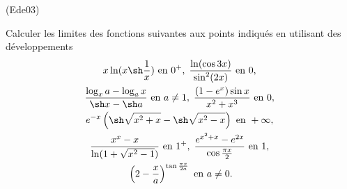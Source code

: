 \begin{tiny}(Ede03)\end{tiny}
Calculer les limites des fonctions suivantes aux points indiqués en utilisant des développements
\begin{multline*}
 x\ln(x\sh \frac{1}{x})\text{ en } 0^+, \;
  \frac{\ln(\cos 3x)}{\sin^2(2x)} \text{ en } 0, \;\\
  \frac{\log_x a - \log_a x}{\sh x - \sh a} \text{ en } a\neq 1, \;
  \frac{(1-e^x)\sin x}{x^2+x^3} \text{ en } 0, \;\\
  e^{-x}\left(\sh\sqrt{x^2+x}-\sh\sqrt{x^2-x} \right) \text{ en } +\infty, \; \\
  \frac{x^x-x}{\ln(1+\sqrt{x^2-1})} \text{ en } 1^+ , \; 
  \frac{e^{x^2+x}-e^{2x}}{\cos\frac{\pi x}{2}}\text{ en } 1 , \; \\
  \left(2-\frac{x}{a} \right)^{\tan\frac{\pi x}{2a}} \text{ en } a\neq 0.
\end{multline*}
